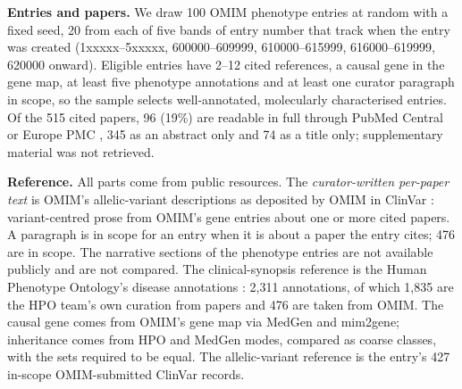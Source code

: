 \documentclass{article} %
\begin{document}
\textbf{Entries and papers.} We draw 100 OMIM phenotype entries at random with a fixed seed, 20 from each of five bands of entry number that track when the entry was created (1xxxxx--5xxxxx, 600000--609999, 610000--615999, 616000--619999, 620000 onward). Eligible entries have 2--12 cited references, a causal gene in the gene map, at least five phenotype annotations and at least one curator paragraph in scope, so the sample selects well-annotated, molecularly characterised entries. Of the 515 cited papers, 96 (19\%) are readable in full through PubMed Central or Europe PMC \citep{rosonovski2024europe}, 345 as an abstract only and 74 as a title only; supplementary material was not retrieved.

\textbf{Reference.} All parts come from public resources. The \emph{curator-written per-paper text} is OMIM's allelic-variant descriptions as deposited by OMIM in ClinVar \citep{landrum2025clinvar}: variant-centred prose from OMIM's gene entries about one or more cited papers. A paragraph is in scope for an entry when it is about a paper the entry cites; 476 are in scope. The narrative sections of the phenotype entries are not available publicly and are not compared. The clinical-synopsis reference is the Human Phenotype Ontology's disease annotations \citep{gargano2024human}: 2,311 annotations, of which 1,835 are the HPO team's own curation from papers and 476 are taken from OMIM. The causal gene comes from OMIM's gene map via MedGen \citep{Louden2020MedgenNcbis} and mim2gene; inheritance comes from HPO and MedGen modes, compared as coarse classes, with the sets required to be equal. The allelic-variant reference is the entry's 427 in-scope OMIM-submitted ClinVar records.
\end{document}
